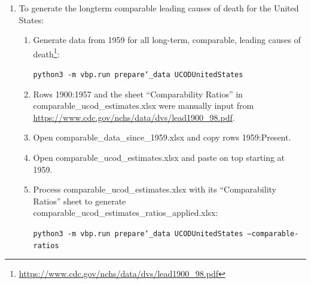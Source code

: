 \documentclass[10pt, a4paper, twocolumn]{IEEEconf}
\begin{document}
\begin{enumerate}
  \item \label{generateuslongterm} To generate the longterm comparable leading causes of death for the United States:
    \begin{enumerate}
      \item Generate data from 1959 for all long-term, comparable, leading causes of death\footnote{\scriptsize{\url{https://www.cdc.gov/nchs/data/dvs/lead1900_98.pdf}}}:
      
            \texttt{python3 -m vbp.run prepare\char`_data UCODUnitedStates}

      \item Rows 1900:1957 and the sheet \enquote{Comparability Ratios} in comparable\_ucod\_estimates.xlsx were manually input from \url{https://www.cdc.gov/nchs/data/dvs/lead1900_98.pdf}.
      \item Open comparable\_data\_since\_1959.xlsx and copy rows 1959:Present.
      \item Open comparable\_ucod\_estimates.xlsx and paste on top starting at 1959.
      \item Process comparable\_ucod\_estimates.xlsx with its \enquote{Comparability Ratios} sheet to generate comparable\_ucod\_estimates\_ratios\_applied.xlsx:
      
            \texttt{python3 -m vbp.run prepare\char`_data UCODUnitedStates --comparable-ratios}


\end{enumerate}
\end{enumerate}
\end{document}
